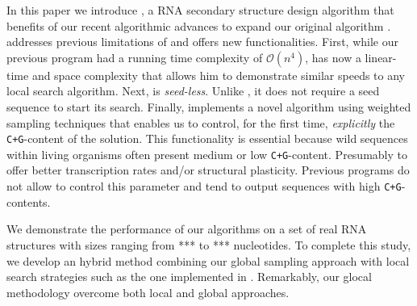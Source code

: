 In this paper we introduce \RNApyro, a RNA secondary structure design algorithm that benefits of our recent algorithmic advances \cite{Reinharz:2013aa} to expand our original \RNAensign algorithm \cite{Levin:2012kx}. \RNApyro addresses previous limitations of \RNAensign and offers new functionalities. First, while our previous program had a running time complexity of $\mathcal{O}(n^4)$, \RNApyro has now a linear-time and space complexity that allows him to demonstrate similar speeds to any local search algorithm. Next, \RNApyro is \textit{seed-less}. Unlike \RNAensign, it does not require a seed sequence to start its search. Finally, \RNApyro implements a novel algorithm using weighted sampling techniques \cite{Bodini2010} that enables us to control, for the first time, \textit{explicitly} the \texttt{C+G}-content of the solution. This functionality is essential because wild sequences within living organisms often present medium or low \texttt{C+G}-content. Presumably to offer better transcription rates and/or structural plasticity. Previous programs do not allow to control this parameter and tend to output sequences with high \texttt{C+G}-contents. 

We demonstrate the performance of our algorithms on a set of real RNA structures with sizes ranging from *** to *** nucleotides. To complete this study, we develop an hybrid method combining our global sampling approach with local search strategies such as the one implemented in \RNAinverse. Remarkably, our glocal methodology overcome both local and global approaches.